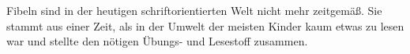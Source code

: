 Fibeln sind in der heutigen schriftorientierten Welt nicht mehr zeitgemäß.
Sie stammt aus einer Zeit, als in der Umwelt der meisten Kinder kaum etwas zu lesen war und stellte den nötigen Übungs- und Lesestoff zusammen.